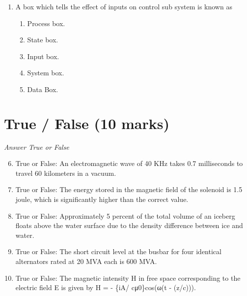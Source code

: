 \documentclass[12pt]{article}
\begin{document}
\begin{enumerate}[label=\arabic*.]
\begin{enumerate}[label=(\alph*)]
    \item A + B = |375| |475|, A - B = |-2 -9 -1| |2 -32|
    \item A + B = |473| |475|, A - B = |-1 -10 -1| |2 -31|
    \item A + B = |375| |475|, A - B = |-2 -9 -2| |1 -31|
    \item A + B = |375| |474|, A - B = |-1 -8 -1| |2 -32|
\end{enumerate}
\item A box which tells the effect of inputs on control sub system is known as
\begin{enumerate}[label=(\alph*)]
    \item Process box.
    \item State box.
    \item Input box.
    \item System box.
    \item Data Box.
\end{enumerate}
\end{enumerate}

\section*{True / False (10 marks)}
\textit{Answer True or False}
\begin{enumerate}[label=\arabic*.]
\setcounter{enumi}{5}
\item True or False: An electromagnetic wave of 40 KHz takes 0.7 milliseconds to travel 60 kilometers in a vacuum.
\item True or False: The energy stored in the magnetic field of the solenoid is 1.5 joule, which is significantly higher than the correct value.
\item True or False: Approximately 5 percent of the total volume of an iceberg floats above the water surface due to the density difference between ice and water.
\item True or False: The short circuit level at the busbar for four identical alternators rated at 20 MVA each is 600 MVA.
\item True or False: The magnetic intensity H in free space corresponding to the electric field E is given by H = - \{iA/ cμ0\}cos(ω(t - (z/c))).
\end{enumerate}
\end{document}
